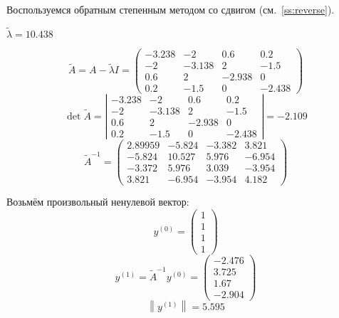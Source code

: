 \documentclass[a4paper,12pt,notitlepage,pdftex,headsepline]{scrartcl}
\begin{document}
Воспользуемся обратным степенным методом со сдвигом (см.~\ref{ss:reverse}).

$\tilde\lambda = 10.438$

\[
\tilde{A} = A - \tilde\lambda I = \left(
\begin{matrix}
-3.238 & -2 & 0.6 & 0.2\\
-2 & -3.138 & 2 & -1.5\\
0.6 & 2 & -2.938 & 0\\
0.2 & -1.5 & 0 & -2.438
\end{matrix}
\right)
\]
\[
\det{\tilde{A}} = \left|
\begin{matrix}
-3.238 & -2 & 0.6 & 0.2\\
-2 & -3.138 & 2 & -1.5\\
0.6 & 2 & -2.938 & 0\\
0.2 & -1.5 & 0 & -2.438
\end{matrix}\right| = -2.109\]
\[
\tilde{A}^{-1} = \left(
\begin{matrix}
2.89959 & -5.824 & -3.382 & 3.821\\
-5.824 & 10.527 & 5.976 & -6.954\\
-3.372 & 5.976 & 3.039 & -3.954\\
3.821 & -6.954 & -3.954 & 4.182
\end{matrix}
\right)
\]

Возьмём произвольный ненулевой вектор:
\[y^{\left(0\right)} = \left(\begin{matrix}
1\\
1\\
1\\
1
\end{matrix}\right)\]
\[y^{\left(1\right)} = \tilde{A}^{-1} y^{\left(0\right)} = \left(\begin{matrix}
-2.476\\
3.725\\
1.67\\
-2.904
\end{matrix}\right)
\]
\[\left\|y^{\left(1\right)}\right\| = 5.595\]
\end{document}
